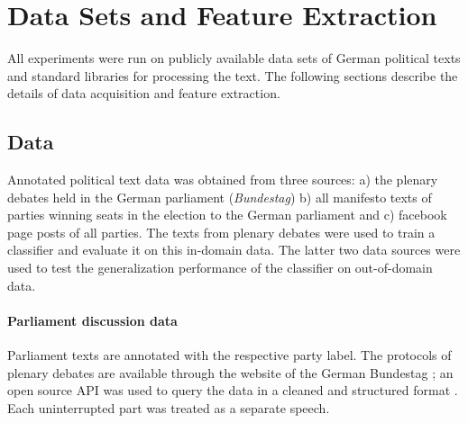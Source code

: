 \documentclass[11pt]{article}
\begin{document}
\section{Data Sets and Feature Extraction}\label{sec:data}
%
All experiments were run on publicly available data sets of German political texts and standard libraries for processing the text. The following sections describe the details of data acquisition and feature extraction.

\subsection{Data}
Annotated political text data was obtained from three sources: a) the plenary debates held in the German parliament ({\em Bundestag}) b) all manifesto texts of parties winning seats in the election to the German parliament and c) facebook page posts of all parties. The texts from plenary debates were used to train a classifier and evaluate it on this in-domain data. The latter two data sources were used to test the generalization performance of the classifier on out-of-domain data. 

\paragraph{Parliament discussion data} Parliament texts are annotated with the respective party label. The protocols of plenary debates are available through the website of the German Bundestag \cite{bundestag}; an open source API was used to query the data in a cleaned and structured format \cite{bundestag-github}. Each uninterrupted part was treated as a separate speech. 
\end{document}
